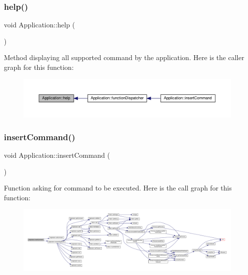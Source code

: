 \subsubsection{\texorpdfstring{help()}{help()}}
{\footnotesize\ttfamily void Application\+::help (\begin{DoxyParamCaption}{ }\end{DoxyParamCaption})\hspace{0.3cm}{\ttfamily [private]}}

Method displaying all supported command by the application. Here is the caller graph for this function\+:
\nopagebreak
\begin{figure}[H]
\begin{center}
\leavevmode
\includegraphics[width=350pt]{class_application_a2c6518d7f121299d9be8c66d31997fbc_icgraph}
\end{center}
\end{figure}
\mbox{\label{class_application_a474d8507e340581404d4044c0228f655}} 
\subsubsection{\texorpdfstring{insert\+Command()}{insertCommand()}}
{\footnotesize\ttfamily void Application\+::insert\+Command (\begin{DoxyParamCaption}{ }\end{DoxyParamCaption})}

Function asking for command to be executed. Here is the call graph for this function\+:
\nopagebreak
\begin{figure}[H]
\begin{center}
\leavevmode
\includegraphics[width=350pt]{class_application_a474d8507e340581404d4044c0228f655_cgraph}
\end{center}
\end{figure}
\mbox{\label{class_application_ab2f161414a4e2f16e28321c192051006}} 
